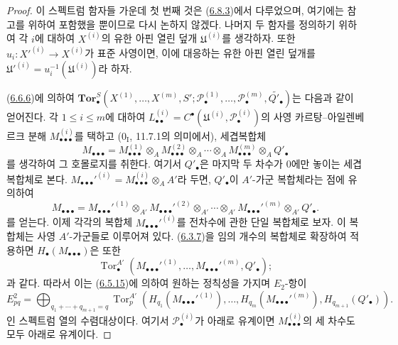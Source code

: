 \begin{proof}
이 스펙트럼 함자들 가운데 첫 번째 것은
(\hyperref[III.6.8.3-fr]{6.8.3})에서 다루었으며, 여기에는
참고를 위하여 포함했을 뿐이므로 다시 논하지 않겠다. 나머지 두
함자를 정의하기 위하여 각 $i$에 대하여 $X^{(i)}$의 유한 아핀
열린 덮개 $\mathfrak U^{(i)}$를 생각하자. 또한
$u_i:X'^{(i)}\to X^{(i)}$가 표준 사영이면, 이에 대응하는 유한
아핀 열린 덮개를
$\mathfrak U'^{(i)}=u_i^{-1}(\mathfrak U^{(i)})$라 하자.

(\hyperref[III.6.6.6-fr]{6.6.6})에 의하여
$\mathbf{Tor}_\bullet^S(X^{(1)},\ldots,X^{(m)},S';
\mathscr P_\bullet^{(1)},\ldots,\mathscr P_\bullet^{(m)},
\widetilde{Q'_\bullet})$는 다음과 같이 얻어진다. 각
$1\leq i\leq m$에 대하여
$L_{\bullet\bullet}^{(i)}=C^\bullet(\mathfrak U^{(i)},
\mathscr P_\bullet^{(i)})$의 사영 카르탕--아일렌베르크 분해
$M_{\bullet\bullet\bullet}^{(i)}$를 택하고
($0_{\mathrm I}$, 11.7.1의 의미에서), 세겹복합체
\[
  M_{\bullet\bullet\bullet}
  =M_{\bullet\bullet\bullet}^{(1)}\otimes_A
   M_{\bullet\bullet\bullet}^{(2)}\otimes_A\cdots\otimes_A
   M_{\bullet\bullet\bullet}^{(m)}\otimes_A Q'_\bullet
\]
를 생각하여 그 호몰로지를 취한다. 여기서 $Q'_\bullet$은 마지막
두 차수가 $0$에만 놓이는 세겹복합체로 본다.
$M_{\bullet\bullet\bullet}'^{(i)}
=M_{\bullet\bullet\bullet}^{(i)}\otimes_A A'$라 두면,
$Q'_\bullet$이 $A'$-가군 복합체라는 점에 유의하여
\[
  M_{\bullet\bullet\bullet}
  =M_{\bullet\bullet\bullet}'^{(1)}\otimes_{A'}
   M_{\bullet\bullet\bullet}'^{(2)}\otimes_{A'}\cdots\otimes_{A'}
   M_{\bullet\bullet\bullet}'^{(m)}\otimes_{A'} Q'_\bullet.
\]
를 얻는다. 이제 각각의 복합체
$M_{\bullet\bullet\bullet}'^{(i)}$를 전차수에 관한 단일 복합체로
보자. 이 복합체는 사영 $A'$-가군들로 이루어져 있다.
(\hyperref[III.6.3.7-fr]{6.3.7})을 임의 개수의 복합체로 확장하여
적용하면 $H_\bullet(M_{\bullet\bullet\bullet})$은 또한
\[
  \operatorname{Tor}_\bullet^{A'}
  (M_{\bullet\bullet\bullet}'^{(1)},\ldots,
   M_{\bullet\bullet\bullet}'^{(m)},Q'_\bullet);
\]
과 같다. 따라서 이는 (\hyperref[III.6.5.15-fr]{6.5.15})에 의하여
원하는 정칙성을 가지며 $E_2$-항이
\[
  E_{pq}^2
  =\bigoplus_{q_1+\cdots+q_{m+1}=q}
  \operatorname{Tor}_p^{A'}
  (H_{q_1}(M_{\bullet\bullet\bullet}'^{(1)}),\ldots,
   H_{q_m}(M_{\bullet\bullet\bullet}'^{(m)}),
   H_{q_{m+1}}(Q'_\bullet)).
\]
인 스펙트럼 열의 수렴대상이다. 여기서
$\mathscr P_\bullet^{(i)}$가 아래로 유계이면
$M_{\bullet\bullet\bullet}^{(i)}$의 세 차수도 모두 아래로 유계이다.


\end{proof}
